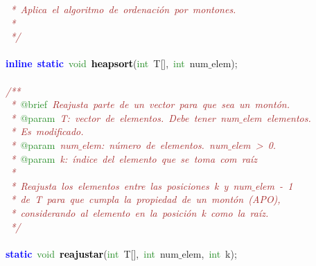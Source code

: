 \mbox{}\textit{\textcolor{Brown}{\ *\ Aplica\ el\ algoritmo\ de\ ordenación\ por\ montones.}} \\
\mbox{}\textit{\textcolor{Brown}{\ *\ }} \\
\mbox{}\textit{\textcolor{Brown}{\ */}} \\
\mbox{} \\
\mbox{}\textbf{\textcolor{Blue}{inline}}\ \textbf{\textcolor{Blue}{static}}\ \textcolor{ForestGreen}{void}\ \textbf{\textcolor{Black}{heapsort}}\textcolor{BrickRed}{(}\textcolor{ForestGreen}{int}\ T\textcolor{BrickRed}{[],}\ \textcolor{ForestGreen}{int}\ num$\_$elem\textcolor{BrickRed}{);} \\
\mbox{} \\
\mbox{}\textit{\textcolor{Brown}{/**}} \\
\mbox{}\textit{\textcolor{Brown}{\ *\ }}\textcolor{ForestGreen}{@brief}\textit{\textcolor{Brown}{\ Reajusta\ parte\ de\ un\ vector\ para\ que\ sea\ un\ montón.}} \\
\mbox{}\textit{\textcolor{Brown}{\ *\ }}\textcolor{ForestGreen}{@param}\textit{\textcolor{Brown}{\ T:\ vector\ de\ elementos.\ Debe\ tener\ num$\_$elem\ elementos.}} \\
\mbox{}\textit{\textcolor{Brown}{\ *\ Es\ modificado.}} \\
\mbox{}\textit{\textcolor{Brown}{\ *\ }}\textcolor{ForestGreen}{@param}\textit{\textcolor{Brown}{\ num$\_$elem:\ número\ de\ elementos.\ num$\_$elem\ \textgreater{}\ 0.}} \\
\mbox{}\textit{\textcolor{Brown}{\ *\ }}\textcolor{ForestGreen}{@param}\textit{\textcolor{Brown}{\ k:\ índice\ del\ elemento\ que\ se\ toma\ com\ raíz}} \\
\mbox{}\textit{\textcolor{Brown}{\ *\ \ \ }} \\
\mbox{}\textit{\textcolor{Brown}{\ *\ Reajusta\ los\ elementos\ entre\ las\ posiciones\ k\ y\ num$\_$elem\ -\ 1\ }} \\
\mbox{}\textit{\textcolor{Brown}{\ *\ de\ T\ para\ que\ cumpla\ la\ propiedad\ de\ un\ montón\ (APO),\ }} \\
\mbox{}\textit{\textcolor{Brown}{\ *\ considerando\ al\ elemento\ en\ la\ posición\ k\ como\ la\ raíz.}} \\
\mbox{}\textit{\textcolor{Brown}{\ */}} \\
\mbox{} \\
\mbox{}\textbf{\textcolor{Blue}{static}}\ \textcolor{ForestGreen}{void}\ \textbf{\textcolor{Black}{reajustar}}\textcolor{BrickRed}{(}\textcolor{ForestGreen}{int}\ T\textcolor{BrickRed}{[],}\ \textcolor{ForestGreen}{int}\ num$\_$elem\textcolor{BrickRed}{,}\ \textcolor{ForestGreen}{int}\ k\textcolor{BrickRed}{);} \\
